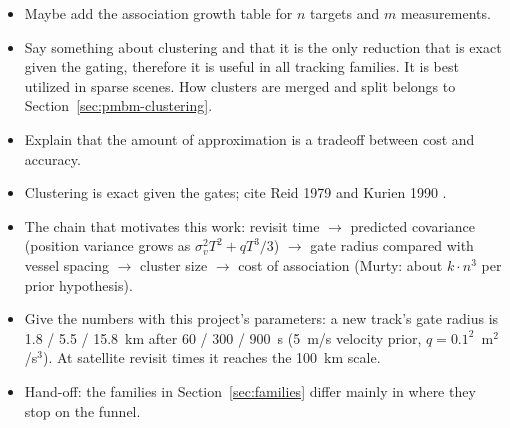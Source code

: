 \begin{itemize}
    \item Maybe add the association growth table for $n$ targets and $m$ measurements.
    \item Say something about clustering and that it is the only reduction that is exact given the gating, therefore it is useful in all tracking families. It is best utilized in sparse scenes. How clusters are merged and split belongs to Section~\ref{sec:pmbm-clustering}.
    \item Explain that the amount of approximation is a tradeoff between cost and accuracy.
\end{itemize}
\begin{itemize}
    \item Clustering is exact given the gates; cite Reid 1979 and Kurien 1990 .
    \item The chain that motivates this work: revisit time $\rightarrow$ predicted covariance (position variance grows as $\sigma_v^2 T^2 + q T^3/3$) $\rightarrow$ gate radius compared with vessel spacing $\rightarrow$ cluster size $\rightarrow$ cost of association (Murty: about $k \cdot n^3$ per prior hypothesis).
    \item Give the numbers with this project's parameters: a new track's gate radius is 1.8 / 5.5 / 15.8~km after 60 / 300 / 900~s (5~m/s velocity prior, $q = 0.1^2$~m$^2$/s$^3$). At satellite revisit times it reaches the 100~km scale.
    \item Hand-off: the families in Section~\ref{sec:families} differ mainly in where they stop on the funnel.
\end{itemize}



